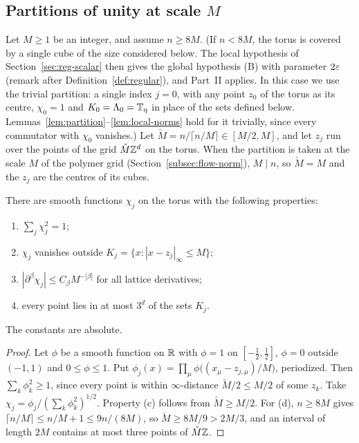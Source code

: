\subsection{Partitions of unity at scale \texorpdfstring{$M$}{M}}\label{ss:17.2}

Let $M\ge1$ be an integer, and assume $n\ge8M$. (If $n<8M$, the torus is covered by a single cube of the size considered below. The local hypothesis of Section~\ref{sec:reg-scalar} then gives the global hypothesis (B) with parameter $2\varepsilon$ (remark after Definition~\ref{def:regular}), and Part~II applies. In this case we use the trivial partition: a single index $j=0$, with any point $z_0$ of the torus as its centre, $\chi_0=1$ and $K_0=\Lambda_0=\mathbb T_\eta$ in place of the sets defined below. Lemmas~\ref{lem:partition}--\ref{lem:local-norms} hold for it trivially, since every commutator with $\chi_0$ vanishes.) Let $\check M=n/\lceil n/M\rceil\in[M/2,M]$, and let $z_j$ run over the points of the grid $\check M\mathbb Z^d$ on the torus. When the partition is taken at the scale $M$ of the polymer grid (Section~\ref{subsec:flow-norm}), $M\mid n$, so $\check M=M$ and the $z_j$ are the centres of its cubes.

\begin{lemma}\label{lem:partition}
There are smooth functions $\chi_j$ on the torus with the following properties:
\begin{enumerate}[label=(\alph*)]
\item $\sum_j\chi_j^2=1$;
\item $\chi_j$ vanishes outside $K_j=\{x:|x-z_j|_\infty\le M\}$;
\item $|\partial^\beta\chi_j|\le C_\beta M^{-|\beta|}$ for all lattice derivatives;
\item every point lies in at most $3^d$ of the sets $K_j$.
\end{enumerate}
The constants are absolute.
\end{lemma}

\begin{proof}
Let $\phi$ be a smooth function on $\mathbb R$ with $\phi=1$ on $[-\frac12,\frac12]$, $\phi=0$ outside $(-1,1)$ and $0\le\phi\le1$. Put $\phi_j(x)=\prod_\mu\phi\big((x_\mu-z_{j,\mu})/M\big)$, periodized. Then $\sum_k\phi_k^2\ge1$, since every point is within $\infty$-distance $\check M/2\le M/2$ of some $z_k$. Take $\chi_j=\phi_j/(\sum_k\phi_k^2)^{1/2}$. Property (c) follows from $\check M\ge M/2$. For (d), $n\ge8M$ gives $\lceil n/M\rceil\le n/M+1\le9n/(8M)$, so $\check M\ge8M/9>2M/3$, and an interval of length $2M$ contains at most three points of $\check M\mathbb Z$.
\end{proof}

